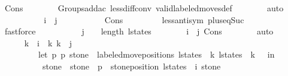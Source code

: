 \begin{isabellebody}
\ Cons{\isacharparenleft}{}{\isacharparenright}\isanewline
\ \ \ \ \ \ \isamarkupfalse%
\ Groups{\isachardot}add{\isacharunderscore}ac{\isacharparenleft}{}{\isacharparenright}\ less{\isacharunderscore}diff{\isacharunderscore}conv\ valid{\isacharunderscore}labeled{\isacharunderscore}moves{\isacharunderscore}def\isanewline
\ \ \ \ \ \ \isamarkupfalse%
\ auto\isanewline
\ \ \ \ \isamarkupfalse%
\isanewline
\ \ \ \ \isamarkupfalse%
\ {\isachardoublequoteopen}i\ {\isacharless}\ j\ {\isacharminus}\ {}{\isachardoublequoteclose}\ \isanewline
\ \ \ \ \ \ \isamarkupfalse%
\ Cons{\isacharparenleft}{}{\isacharparenright}\ {\isacharasterisk}\isanewline
\ \ \ \ \ \ \isamarkupfalse%
\ less{\isacharunderscore}antisym\ plus{\isacharunderscore}{}{\isacharunderscore}eq{\isacharunderscore}Suc\isanewline
\ \ \ \ \ \ \isamarkupfalse%
\ fastforce\isanewline
\ \ \ \ \isamarkupfalse%
\isanewline
\ \ \ \ \isamarkupfalse%
\ {\isachardoublequoteopen}j\ {\isacharminus}\ {}\ {\isacharless}\ length\ l{\isacharunderscore}states{\isachardoublequoteclose}\isanewline
\ \ \ \ \ \ \isamarkupfalse%
\ {\isacharbackquoteopen}i\ {\isacharless}\ j{\isacharbackquoteclose}\ Cons{\isacharparenleft}{}{\isacharparenright}\isanewline
\ \ \ \ \ \ \isamarkupfalse%
\ auto\isanewline
\ \ \ \ \isamarkupfalse%
\isanewline
\ \ \ \ \isamarkupfalse%
\ k\ \ {\isachardoublequoteopen}i\ {\isasymle}\ k{\isachardoublequoteclose}\ {\isachardoublequoteopen}k\ {\isacharless}\ j\ {\isacharminus}\ {}{\isachardoublequoteclose}\isanewline
\ \ \ \ \ \ \ \ \ {\isachardoublequoteopen}let\ {\isacharparenleft}p{}{\isacharcomma}\ p{}{\isacharcomma}\ stone{\isacharprime}{\isacharparenright}\ {\isacharequal}\ labeled{\isacharunderscore}move{\isacharunderscore}positions\ {\isacharparenleft}l{\isacharunderscore}states\ {\isacharbang}\ k{\isacharparenright}\ {\isacharparenleft}l{\isacharunderscore}states\ {\isacharbang}\ {\isacharparenleft}k\ {\isacharplus}\ {}{\isacharparenright}{\isacharparenright}\ in\ \isanewline
\ \ \ \ \ \ \ \ \ \ stone{\isacharprime}\ {\isacharequal}\ stone\ {\isasymand}\ p{}\ {\isacharequal}\ stone{\isacharunderscore}position\ {\isacharparenleft}l{\isacharunderscore}states\ {\isacharbang}\ i{\isacharparenright}\ stone{\isachardoublequoteclose}\isanewline

\end{isabellebody}
